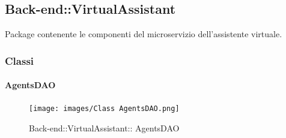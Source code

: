 \subsection{Back-end::VirtualAssistant}
Package contenente le componenti del microservizio dell'assistente virtuale.
\subsubsection{Classi}
\hypertarget{ AgentsDAO_label}{\paragraph{ AgentsDAO}}
\begin{figure}[h]
	\centering
	\texttt{[image: images/Class AgentsDAO.png]}
	\caption{Back-end::VirtualAssistant:: AgentsDAO}
\end{figure}
